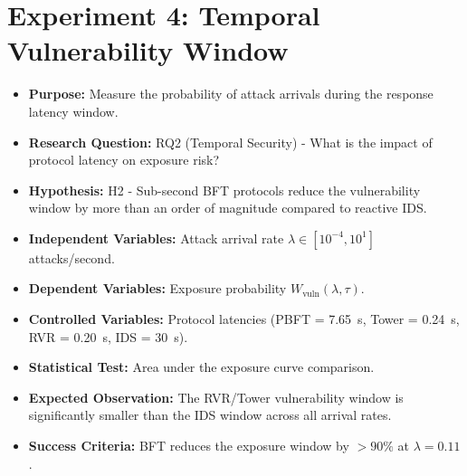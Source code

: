 \documentclass[12pt, oneside, a4paper]{report}
\theoremstyle{definition}
\theoremstyle{remark}
\newcommand{\Wvuln}{W_{\mathrm{vuln}}}
\begin{document}
\section{Experiment 4: Temporal Vulnerability Window}
\label{sec:ed:e4}
\begin{itemize}
  \item \textbf{Purpose:} Measure the probability of attack arrivals during the response latency window.
  \item \textbf{Research Question:} RQ2 (Temporal Security) - What is the impact of protocol latency on exposure risk?
  \item \textbf{Hypothesis:} H2 - Sub-second BFT protocols reduce the vulnerability window by more than an order of magnitude compared to reactive IDS.
  \item \textbf{Independent Variables:} Attack arrival rate $\lambda \in [10^{-4}, 10^1]$ attacks/second.
  \item \textbf{Dependent Variables:} Exposure probability $\Wvuln(\lambda, \tau)$.
  \item \textbf{Controlled Variables:} Protocol latencies (PBFT = 7.65~s, Tower = 0.24~s, RVR = 0.20~s, IDS = 30~s).
  \item \textbf{Statistical Test:} Area under the exposure curve comparison.
  \item \textbf{Expected Observation:} The RVR/Tower vulnerability window is significantly smaller than the IDS window across all arrival rates.
  \item \textbf{Success Criteria:} BFT reduces the exposure window by $> 90\%$ at $\lambda = 0.11$.
\end{itemize}
\end{document}
